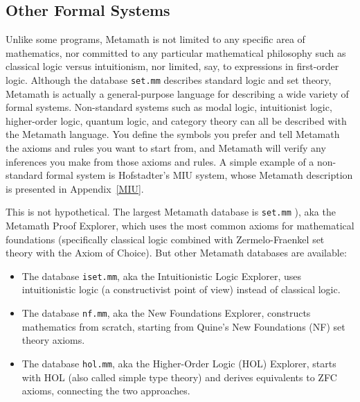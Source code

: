 \subsection{Other Formal Systems}

Unlike some programs, Metamath is not limited to any specific
area of mathematics, nor committed to any particular mathematical philosophy
such as classical logic versus intuitionism, nor limited, say, to expressions
in first-order logic.  Although the database \texttt{set.mm}
describes standard logic and set theory, Meta\-math
is actually a general-purpose language for describing a wide variety of formal
systems.  Non-standard systems such as modal
logic, intuitionist logic, higher-order
logic, quantum logic, and
category theory can all be described with the Metamath
language.  You define the symbols you prefer and tell Metamath the axioms and
rules you want to start from, and Metamath will verify any inferences you make
from those axioms and rules.  A simple example of a non-standard formal system
is Hofstadter's MIU system,
whose Metamath description is presented in Appendix~\ref{MIU}.

This is not hypothetical.
The largest Metamath database is
\texttt{set.mm}%
), aka the Metamath Proof Explorer,
which uses the most common axioms for mathematical foundations
(specifically classical logic combined with Zermelo-Fraenkel
set theory with the Axiom of Choice).
But other Metamath databases are available:

\begin{itemize}
\item The database
  \texttt{iset.mm},
  aka the
  Intuitionistic Logic Explorer,
  uses intuitionistic logic (a constructivist point of view)
  instead of classical logic.
\item The database
  \texttt{nf.mm},
  aka the
  New Foundations Explorer,
  constructs mathematics from scratch,
  starting from Quine's New Foundations (NF) set theory axioms. 
\item The database
  \texttt{hol.mm},
  aka the
  Higher-Order Logic (HOL) Explorer,
  starts with HOL (also called simple type theory) and derives
  equivalents to ZFC axioms, connecting the two approaches. 
\end{itemize}

